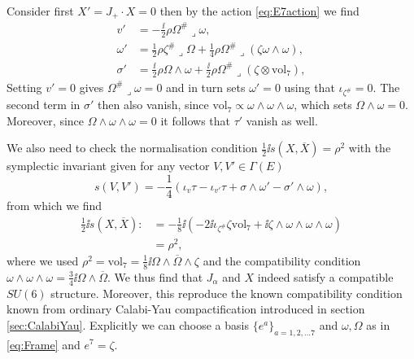 Consider first $X'=J_+\cdot X=0$ then by the action \eqref{eq:E7action} we find 
\begin{equation}
    \begin{aligned}
        v' &= -\frac{\ii}{2}\rho\Omega^{\#}\lrcorner\omega,\\
        \omega' &= \frac{1}{2}\rho\zeta^{\#}\lrcorner \Omega+\frac{1}{4}\rho\Omega^{\#}\lrcorner (\zeta\omega\wedge\omega),\\
        \sigma' &= \frac{\ii}{2}\rho\Omega\wedge \omega+\frac{\ii}{2}\rho \Omega^{\#}\lrcorner (\zeta\otimes \text{vol}_7),
    \end{aligned}
\end{equation}
Setting $v'=0$ gives $\Omega^{\#}\lrcorner \omega = 0$ and in turn sets $\omega'=0$ using that $\iota_{\zeta^{\#}}=0$. The second term in $\sigma'$ then also vanish, since $\text{vol}_7\propto \omega\wedge\omega\wedge\omega$, which sets $\Omega\wedge\omega=0$. Moreover, since $\Omega\wedge\omega\wedge\omega=0$ it follows that $\tau'$ vanish as well. 


We also need to check the normalisation condition $\frac{1}{2}\ii s(X,\overbar{X})=\rho^2$ with the symplectic invariant given for any vector $V,V'\in\Gamma(E)$
\begin{equation}
    s(V,V') = -\frac{1}{4}(\iota_{v}\tau-\iota_{v'}\tau+\sigma\wedge\omega'-\sigma'\wedge\omega), 
\end{equation}
from which we find 
\begin{equation}
    \begin{aligned}
    \frac{1}{2}\ii s(X,\overbar{X}):&= -\frac{1}{8}\ii \left(-2\ii\iota_{\zeta^{\#}}\zeta\text{vol}_7+\ii\zeta\wedge\omega\wedge\omega\wedge\omega\right)\\
    &= \rho^2,
    \end{aligned}
\end{equation}
where we used $\rho^2=\text{vol}_7=\frac{1}{8}\ii\Omega\wedge\overbar{\Omega}\wedge\zeta$ and the compatibility condition $\omega\wedge\omega\wedge\omega=\frac{3}{4}\ii\Omega\wedge\overbar{\Omega}$. We thus find that $J_\alpha$ and $X$ indeed satisfy a compatible $SU(6)$ structure. Moreover, this reproduce the known compatibility condition known from ordinary Calabi-Yau compactification introduced in section \ref{sec:CalabiYau}. Explicitly we can choose a basis $\{e^a\}_{a=1,2,\ldots 7}$ and $\omega,\Omega$ as in \eqref{eq:Frame} and $e^7=\zeta$. 

